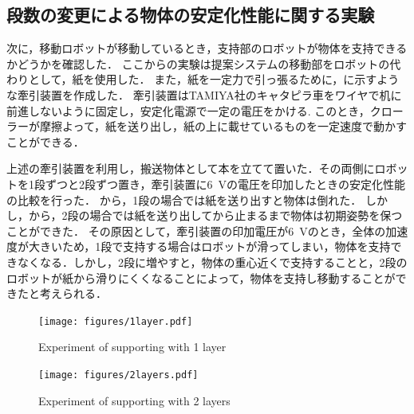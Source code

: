 \subsection{段数の変更による物体の安定化性能に関する実験}
次に，移動ロボットが移動しているとき，支持部のロボットが物体を支持できるかどうかを確認した．
ここからの実験は提案システムの移動部をロボットの代わりとして，紙を使用した．
また，紙を一定力で引っ張るために，に示すような牽引装置を作成した．
牽引装置はTAMIYA社のキャタピラ車をワイヤで机に前進しないように固定し，安定化電源で一定の電圧をかける. このとき，クローラーが摩擦よって，紙を送り出し，紙の上に載せているものを一定速度で動かすことができる．

上述の牽引装置を利用し，搬送物体として本を立てて置いた．その両側にロボットを1段ずつと2段ずつ置き，牽引装置に6~Vの電圧を印加したときの安定化性能の比較を行った．
から，1段の場合では紙を送り出すと物体は倒れた．
しかし，から，2段の場合では紙を送り出してから止まるまで物体は初期姿勢を保つことができた．
その原因として，牽引装置の印加電圧が6~Vのとき，全体の加速度が大きいため，1段で支持する場合はロボットが滑ってしまい，物体を支持できなくなる．しかし，2段に増やすと，物体の重心近くで支持することと，2段のロボットが紙から滑りにくくなることによって，物体を支持し移動することができたと考えられる．
\begin{figure}[tb]
  \centering
  \texttt{[image: figures/1layer.pdf]}
  \caption{Experiment of supporting with 1 layer}
  \label{fig:1layer}
\end{figure}
\begin{figure}[tb]
  \centering
  \texttt{[image: figures/2layers.pdf]}
  \caption{Experiment of supporting with 2 layers}
  \label{fig:2layer}
\end{figure}

